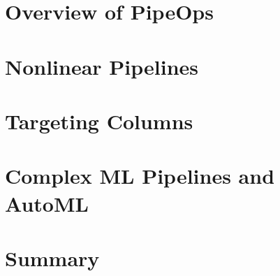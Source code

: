\documentclass[11pt,compress,t,notes=noshow,xcolor=table]{beamer}
\begin{document}




\section{Overview of PipeOps}

\section{Nonlinear Pipelines}

\section{Targeting Columns}


\section{Complex ML Pipelines and AutoML}


\section{Summary}



\endlecture
\end{document}
